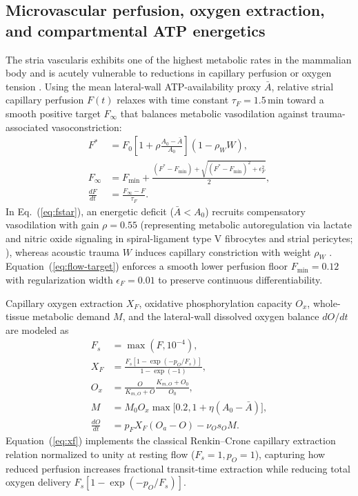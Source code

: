 \documentclass[final,5p,times]{elsarticle}
\begin{document}
\subsection{Microvascular perfusion, oxygen extraction, and compartmental ATP energetics}\label{sec:formulation-energetics}

The stria vascularis exhibits one of the highest metabolic rates in the mammalian body and is acutely vulnerable to reductions in capillary perfusion or oxygen tension \citep{PrazmaPecorak1975,Kusakari1978,Nuttall1999}. Using the mean lateral-wall ATP-availability proxy \(\bar{A}\), relative strial capillary perfusion \(F(t)\) relaxes with time constant \(\tau_F = 1.5\,\mathrm{min}\) toward a smooth positive target \(F_\infty\) that balances metabolic vasodilation against trauma-associated vasoconstriction:
\begin{align}
  F^* &= F_0\left[1 + \rho\frac{A_0 - \bar{A}}{A_0}\right](1 - \rho_W W), \label{eq:fstar}\\
  F_\infty &= F_{\min} + \frac{(F^* - F_{\min}) + \sqrt{(F^* - F_{\min})^2 + \epsilon_F^2}}{2}, \label{eq:flow-target}\\
  \frac{dF}{dt} &= \frac{F_\infty - F}{\tau_F}. \label{eq:df}
\end{align}
In Eq.~(\ref{eq:fstar}), an energetic deficit (\(\bar{A} < A_0\)) recruits compensatory vasodilation with gain \(\rho = 0.55\) (representing metabolic autoregulation via lactate and nitric oxide signaling in spiral-ligament type V fibrocytes and strial pericytes; \citealt{Dai2011}), whereas acoustic trauma \(W\) induces capillary constriction with weight \(\rho_W\) \citep{Nuttall1999,Hou2020}. Equation~(\ref{eq:flow-target}) enforces a smooth lower perfusion floor \(F_{\min} = 0.12\) with regularization width \(\epsilon_F = 0.01\) to preserve continuous differentiability.

Capillary oxygen extraction \(X_F\), oxidative phosphorylation capacity \(O_x\), whole-tissue metabolic demand \(M\), and the lateral-wall dissolved oxygen balance \(dO/dt\) are modeled as
\begin{align}
  F_s &= \max(F, 10^{-4}), \label{eq:fs}\\
  X_F &= \frac{F_s\left[1 - \exp(-p_O / F_s)\right]}{1 - \exp(-1)}, \label{eq:xf}\\
  O_x &= \frac{O}{K_{m,O} + O}\frac{K_{m,O} + O_0}{O_0}, \label{eq:ox}\\
  M &= M_0 O_x \max\bigl[0.2, 1 + \eta(A_0 - \bar{A})\bigr], \label{eq:met-demand}\\
  \frac{dO}{dt} &= p_F X_F(O_a - O) - \nu_O s_O M. \label{eq:do}
\end{align}
Equation~(\ref{eq:xf}) implements the classical Renkin--Crone capillary extraction relation normalized to unity at resting flow (\(F_s = 1, p_O = 1\)), capturing how reduced perfusion increases fractional transit-time extraction while reducing total oxygen delivery \(F_s[1 - \exp(-p_O/F_s)]\).
\end{document}
